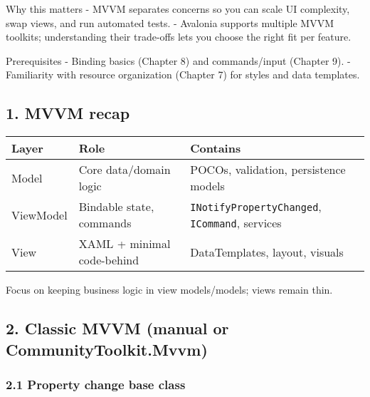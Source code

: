 Why this matters - MVVM separates concerns so you can scale UI
complexity, swap views, and run automated tests. - Avalonia supports
multiple MVVM toolkits; understanding their trade-offs lets you choose
the right fit per feature.

Prerequisites - Binding basics (Chapter 8) and commands/input (Chapter
9). - Familiarity with resource organization (Chapter 7) for styles and
data templates.

\subsection{1. MVVM recap}\label{mvvm-recap}

\begin{longtable}[]{@{}
  >{\raggedright\arraybackslash}p{}
  >{\raggedright\arraybackslash}p{}
  >{\raggedright\arraybackslash}p{}@{}}
\toprule\noalign{}
\begin{minipage}[b]{\linewidth}\raggedright
Layer
\end{minipage} & \begin{minipage}[b]{\linewidth}\raggedright
Role
\end{minipage} & \begin{minipage}[b]{\linewidth}\raggedright
Contains
\end{minipage} \\
\midrule\noalign{}
\endhead
\bottomrule\noalign{}
\endlastfoot
Model & Core data/domain logic & POCOs, validation, persistence
models \\
ViewModel & Bindable state, commands &
\passthrough{\lstinline!INotifyPropertyChanged!},
\passthrough{\lstinline!ICommand!}, services \\
View & XAML + minimal code-behind & DataTemplates, layout, visuals \\
\end{longtable}

Focus on keeping business logic in view models/models; views remain
thin.

\subsection{2. Classic MVVM (manual or
CommunityToolkit.Mvvm)}\label{classic-mvvm-manual-or-communitytoolkit.mvvm}

\subsubsection{2.1 Property change base
class}\label{property-change-base-class}

